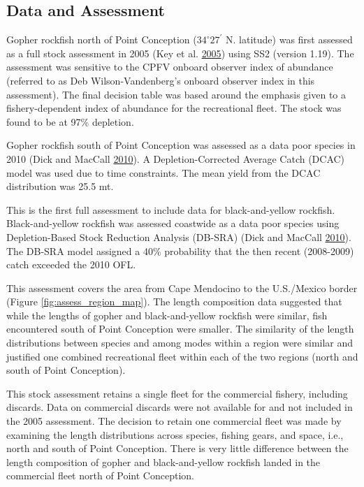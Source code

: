 \documentclass[12pt,]{article}
\begin{document}
\FloatBarrier

\newpage

\subsection*{Data and Assessment}\label{data-and-assessment}

Gopher rockfish north of Point Conception (\(34^\circ 27^\prime\) N.
latitude) was first assessed as a full stock assessment in 2005 (Key et
al. \protect\hyperlink{ref-Key2005}{2005}) using SS2 (version 1.19). The
assessment was sensitive to the CPFV onboard observer index of abundance
(referred to as Deb Wilson-Vandenberg's onboard observer index in this
assessment). The final decision table was based around the emphasis
given to a fishery-dependent index of abundance for the recreational
fleet. The stock was found to be at 97\% depletion.

Gopher rockfish south of Point Conception was assessed as a data poor
species in 2010 (Dick and MacCall
\protect\hyperlink{ref-Dick2010}{2010}). A Depletion-Corrected Average
Catch (DCAC) model was used due to time constraints. The mean yield from
the DCAC distribution was 25.5 mt.

This is the first full assessment to include data for black-and-yellow
rockfish. Black-and-yellow rockfish was assessed coastwide as a data
poor species using Depletion-Based Stock Reduction Analysis (DB-SRA)
(Dick and MacCall \protect\hyperlink{ref-Dick2010}{2010}). The DB-SRA
model assigned a 40\% probability that the then recent (2008-2009) catch
exceeded the 2010 OFL.

This assessment covers the area from Cape Mendocino to the U.S./Mexico
border (Figure \ref{fig:assess_region_map}). The length composition data
suggested that while the lengths of gopher and black-and-yellow rockfish
were similar, fish encountered south of Point Conception were smaller.
The similarity of the length distributions between species and among
modes within a region were similar and justified one combined
recreational fleet within each of the two regions (north and south of
Point Conception).

This stock assessment retains a single fleet for the commercial fishery,
including discards. Data on commercial discards were not available for
and not included in the 2005 assessment. The decision to retain one
commercial fleet was made by examining the length distributions across
species, fishing gears, and space, i.e., north and south of Point
Conception. There is very little difference between the length
composition of gopher and black-and-yellow rockfish landed in the
commercial fleet north of Point Conception.
\end{document}
